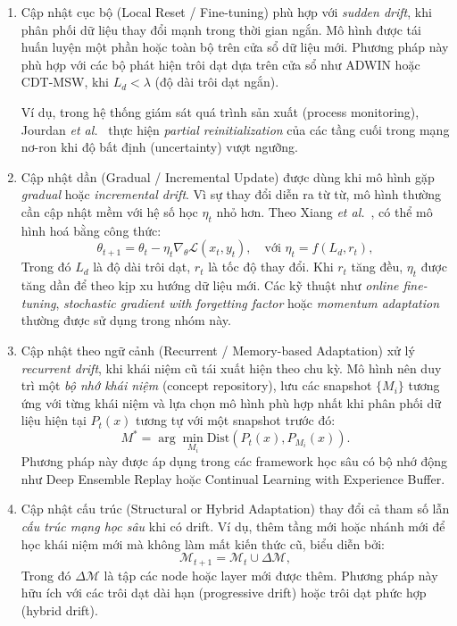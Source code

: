 \begin{enumerate}[label=(\alph*)]
	\item Cập nhật cục bộ (Local Reset / Fine-tuning) phù hợp với \emph{sudden drift}, khi phân phối dữ liệu thay đổi mạnh trong thời gian ngắn. Mô hình được tái huấn luyện một phần hoặc toàn bộ trên cửa sổ dữ liệu mới. Phương pháp này phù hợp với các bộ phát hiện trôi dạt dựa trên cửa sổ như ADWIN hoặc CDT-MSW, khi $L_d < \lambda$ (độ dài trôi dạt ngắn).

	      Ví dụ, trong hệ thống giám sát quá trình sản xuất (process monitoring), Jourdan \textit{et al.}~\cite{jourdan2023process} thực hiện \emph{partial reinitialization} của các tầng cuối trong mạng nơ-ron khi độ bất định (uncertainty) vượt ngưỡng.

	\item Cập nhật dần (Gradual / Incremental Update) được dùng khi mô hình gặp \emph{gradual} hoặc \emph{incremental drift}. Vì sự thay đổi diễn ra từ từ, mô hình thường cần cập nhật mềm với hệ số học $\eta_t$ nhỏ hơn. Theo Xiang \textit{et al.}~\cite{xiang2023review}, có thể mô hình hoá bằng công thức:
	      \[
		      \theta_{t+1} = \theta_t - \eta_t \nabla_\theta \mathcal{L}(x_t, y_t),
		      \quad \text{với } \eta_t = f(L_d, r_t),
	      \]
	      Trong đó $L_d$ là độ dài trôi dạt, $r_t$ là tốc độ thay đổi. Khi $r_t$ tăng đều, $\eta_t$ được tăng dần để theo kịp xu hướng dữ liệu mới. Các kỹ thuật như \emph{online fine-tuning}, \emph{stochastic gradient with forgetting factor} hoặc \emph{momentum adaptation} thường được sử dụng trong nhóm này.

	\item Cập nhật theo ngữ cảnh (Recurrent / Memory-based Adaptation) xử lý \emph{recurrent drift}, khi khái niệm cũ tái xuất hiện theo chu kỳ. Mô hình nên duy trì một \emph{bộ nhớ khái niệm} (concept repository), lưu các snapshot $\{M_i\}$ tương ứng với từng khái niệm và lựa chọn mô hình phù hợp nhất khi phân phối dữ liệu hiện tại $P_t(x)$ tương tự với một snapshot trước đó:
	      \[
		      M^* = \arg\min_{M_i} \text{Dist}(P_t(x), P_{M_i}(x)).
	      \]
	      Phương pháp này được áp dụng trong các framework học sâu có bộ nhớ động như Deep Ensemble Replay hoặc Continual Learning with Experience Buffer.

	\item Cập nhật cấu trúc (Structural or Hybrid Adaptation) thay đổi cả tham số lẫn \emph{cấu trúc mạng học sâu} khi có drift.
	      Ví dụ, thêm tầng mới hoặc nhánh mới để học khái niệm mới mà không làm mất kiến thức cũ, biểu diễn bởi:
	      \[
		      \mathcal{M}_{t+1} = \mathcal{M}_t \cup \Delta \mathcal{M},
	      \]
	      Trong đó $\Delta \mathcal{M}$ là tập các node hoặc layer mới được thêm. Phương pháp này hữu ích với các trôi dạt dài hạn (progressive drift) hoặc trôi dạt phức hợp (hybrid drift).
\end{enumerate}

